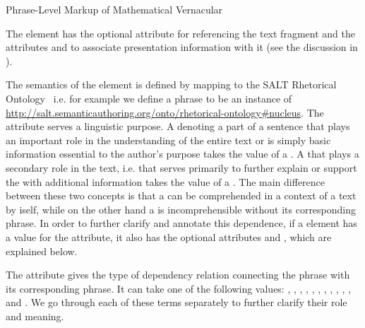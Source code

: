\begin{module}[id=mtext]
\begin{omgroup}[id=mtext,short=Mathematical Text]
\begin{omgroup}[id=phrases]{Phrase-Level Markup of Mathematical Vernacular}
\begin{definition}[id=span.def]
  The {} element has the optional attribute
   for referencing the text fragment and the {\css}
  attributes  and 
  to associate presentation information with it (see the discussion in
  {}).
\end{definition}

The semantics of the  element is defined by mapping to the SALT
Rhetorical Ontology~\cite{Groza:SALT07} i.e. for example we define a
 phrase to be an instance of
\url{http://salt.semanticauthoring.org/onto/rhetorical-ontology#nucleus}.  The
 attribute serves a linguistic purpose. A
 denoting a part of a sentence that plays an important role in
the understanding of the entire text or is simply basic information essential to the
author's purpose takes the value of a . A
 that plays a secondary role in the text, i.e. that serves
primarily to further explain or support the  with
additional information takes the value of a
. The main difference between these two concepts
is that a  can be comprehended in a context of a
text by iself, while on the other hand a  is
incomprehensible without its corresponding 
phrase. In order to further clarify and annotate this dependence, if a
 element has a value 
for the  attribute, it also has the optional attributes
 and , which are
explained below.

  The  attribute gives the type of dependency relation 
  connecting the  phrase with its corresponding 
   phrase. It can take one of the following values: 
  , , 
  , , 
  , , 
  , , 
  , , 
  ,  and 
  . We go through each of these terms 
  separately to further clarify their role and meaning.


\end{omgroup}
\end{omgroup}
\end{module}
